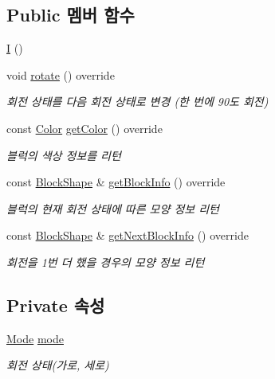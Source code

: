 \subsection*{Public 멤버 함수}
\begin{DoxyCompactItemize}
\item 
\mbox{\hyperlink{class_i_ae21899806c8e3ea9c22b8ca5f6d1b949}{I}} ()
\item 
void \mbox{\hyperlink{class_i_a5ee89d0f1ddc27429dfd0c83edf86ad5}{rotate}} () override
\begin{DoxyCompactList}\small\item\em 회전 상태를 다음 회전 상태로 변경 (한 번에 90도 회전) \end{DoxyCompactList}\item 
const \mbox{\hyperlink{class_block_ad054b4ac51df79aa910040b2a2fdf7b5}{Color}} \mbox{\hyperlink{class_i_afa15b62959b0207778d0db1763aff784}{get\+Color}} () override
\begin{DoxyCompactList}\small\item\em 블럭의 색상 정보를 리턴 \end{DoxyCompactList}\item 
const \mbox{\hyperlink{class_block_aca5d951639f113e2ebd7856209d6b9ab}{Block\+Shape}} \& \mbox{\hyperlink{class_i_a21f835547d478a560c6616d8ca81e966}{get\+Block\+Info}} () override
\begin{DoxyCompactList}\small\item\em 블럭의 현재 회전 상태에 따른 모양 정보 리턴 \end{DoxyCompactList}\item 
const \mbox{\hyperlink{class_block_aca5d951639f113e2ebd7856209d6b9ab}{Block\+Shape}} \& \mbox{\hyperlink{class_i_ae5a6c09baa0575ff54446278a32a900a}{get\+Next\+Block\+Info}} () override
\begin{DoxyCompactList}\small\item\em 회전을 1번 더 했을 경우의 모양 정보 리턴 \end{DoxyCompactList}\end{DoxyCompactItemize}
\subsection*{Private 속성}
\begin{DoxyCompactItemize}
\item 
\mbox{\hyperlink{class_block_a33a96023993478ad4b52426188454765}{Mode}} \mbox{\hyperlink{class_i_a97884fed99bc779803178b5c3f4bc02d}{mode}}
\begin{DoxyCompactList}\small\item\em 회전 상태(가로, 세로) \end{DoxyCompactList}\end{DoxyCompactItemize}
